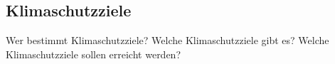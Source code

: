 












\subsection{Klimaschutzziele}
Wer bestimmt Klimaschutzziele?
Welche Klimaschutzziele gibt es?
Welche Klimaschutzziele sollen erreicht werden?



\newpage



































